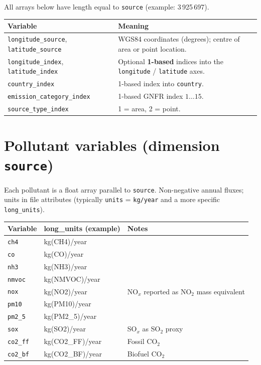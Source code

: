 \documentclass[11pt,a4paper]{article}
\begin{document}
All arrays below have length equal to \texttt{source} (example: 3\,925\,697).

\begin{center}
\begin{tabular}{p{4.2cm}p{8.5cm}}
  \toprule
  Variable & Meaning \\
  \midrule
  \texttt{longitude\_source}, \texttt{latitude\_source} & WGS84 coordinates (degrees); centre of area or point location. \\
  \texttt{longitude\_index}, \texttt{latitude\_index} & Optional \textbf{1-based} indices into the \texttt{longitude} / \texttt{latitude} axes. \\
  \texttt{country\_index} & 1-based index into \texttt{country}. \\
  \texttt{emission\_category\_index} & 1-based GNFR index $1\ldots15$. \\
  \texttt{source\_type\_index} & 1 = area, 2 = point. \\
  \bottomrule
\end{tabular}
\end{center}

\section{Pollutant variables (dimension \texttt{source})}

Each pollutant is a float array parallel to \texttt{source}. Non-negative annual fluxes; units in file attributes (typically \texttt{units} = \texttt{kg/year} and a more specific \texttt{long\_units}).

\begin{center}
\small
\begin{tabular}{lll}
  \toprule
  Variable & long\_units (example) & Notes \\
  \midrule
  \texttt{ch4} & kg(CH4)/year & \\
  \texttt{co} & kg(CO)/year & \\
  \texttt{nh3} & kg(NH3)/year & \\
  \texttt{nmvoc} & kg(NMVOC)/year & \\
  \texttt{nox} & kg(NO2)/year & NO$_x$ reported as NO$_2$ mass equivalent \\
  \texttt{pm10} & kg(PM10)/year & \\
  \texttt{pm2\_5} & kg(PM2\_5)/year & \\
  \texttt{sox} & kg(SO2)/year & SO$_x$ as SO$_2$ proxy \\
  \texttt{co2\_ff} & kg(CO2\_FF)/year & Fossil CO$_2$ \\
  \texttt{co2\_bf} & kg(CO2\_BF)/year & Biofuel CO$_2$ \\
  \bottomrule
\end{tabular}
\end{center}
\end{document}
